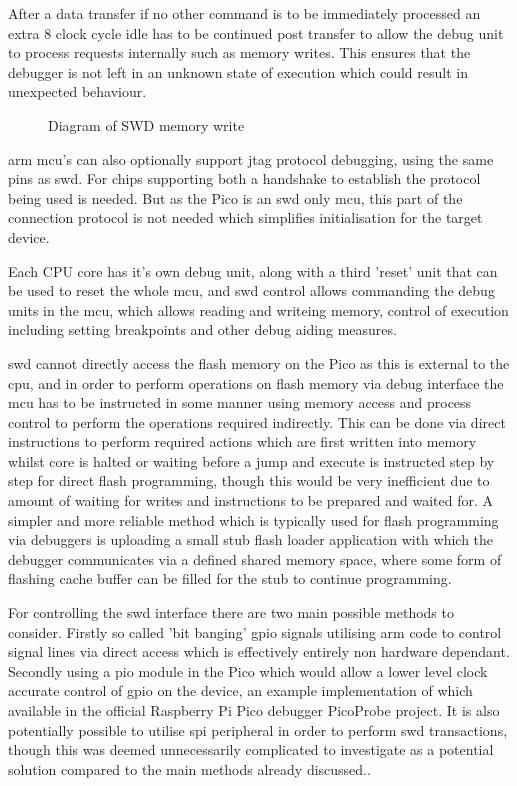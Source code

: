 {After a data transfer if no other command is to be immediately processed an extra 8 clock cycle idle has to be continued post transfer to allow the debug unit to process requests internally such as memory writes. This ensures that the debugger is not left in an unknown state of execution which could result in unexpected behaviour.

\begin{figure}[ht]
	\centering
	\caption{Diagram of SWD memory write\cite{ARMDebugInterface}}
	\label{fig:armswdwrite}
\end{figure}

\gls{arm} \gls{mcu}'s can also optionally support \gls{jtag} protocol debugging, using the same pins as \gls{swd}. For chips supporting both a handshake to establish the protocol being used is needed. But as the Pico is an \gls{swd} only \gls{mcu}, this part of the connection protocol is not needed which simplifies initialisation for the target device.

Each CPU core has it's own debug unit, along with a third 'reset' unit that can be used to reset the whole \gls{mcu}, and \gls{swd} control allows commanding the debug units in the \gls{mcu}, which allows reading and writeing memory, control of execution including setting breakpoints and other debug aiding measures.

\gls{swd} cannot directly access the flash memory on the Pico as this is external to the \gls{cpu}, and in order to perform operations on flash memory via debug interface the \gls{mcu} has to be instructed in some manner using memory access and process control to perform the operations required indirectly. This can be done via direct instructions to perform required actions which are first written into memory whilst core is halted or waiting before a jump and execute is instructed step by step for direct flash programming, though this would be very inefficient due to amount of waiting for writes and instructions to be prepared and waited for. A simpler and more reliable method which is typically used for flash programming via debuggers is uploading a small stub flash loader application with which the debugger communicates via a defined shared memory space, where some form of flashing cache buffer can be filled for the stub to continue programming.

For controlling the \gls{swd} interface there are two main possible methods to consider. Firstly so called 'bit banging' \gls{gpio} signals utilising \gls{arm} code to control signal lines via direct access which is effectively entirely non hardware dependant. Secondly using a \gls{pio} module in the Pico which would allow a lower level clock accurate control of \gls{gpio} on the device, an example implementation of which available in the official Raspberry Pi Pico debugger PicoProbe project\cite{Picoprobe2023}. It is also potentially possible to utilise \gls{spi} peripheral in order to perform \gls{swd} transactions, though this was deemed unnecessarily complicated to investigate as a potential solution compared to the main methods already discussed.\cite{OpenOCDRaspberryPi}.

}

